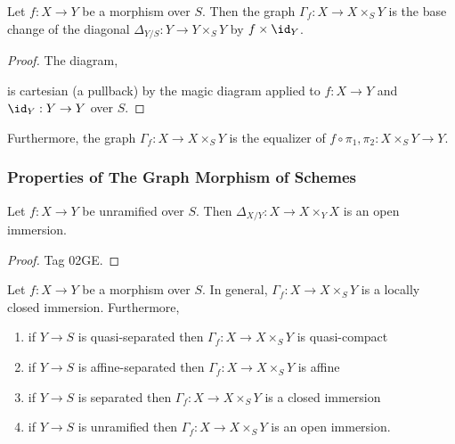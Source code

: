 \documentclass[12pt]{article}
\begin{document}
\begin{cor}
Let $f : X \to Y$ be a morphism over $S$. Then the graph $\Gamma_f : X \to X \times_S Y$ is the base change of the diagonal $\Delta_{Y/S} : Y \to Y \times_S Y$ by $f \times \id_Y$.
\end{cor}

\begin{proof}
The diagram,
\begin{center}
\end{center}
is cartesian (a pullback) by the magic diagram applied to $f : X \to Y$ and $\id_Y : Y \to Y$ over $S$.
\end{proof}

\begin{rmk}
Furthermore, the graph $\Gamma_f : X \to X \times_S Y$ is the equalizer of $f \circ \pi_1, \pi_2 : X \times_S Y \to Y$.
\end{rmk}

\subsubsection{Properties of The Graph Morphism of Schemes}

\begin{lemma}
Let $f : X \to Y$ be unramified over $S$. Then $\Delta_{X/Y} : X \to X \times_Y X$ is an open immersion.
\end{lemma}

\begin{proof}
Tag 02GE.
\end{proof}

\begin{cor}
Let $f : X \to Y$ be a morphism over $S$. In general, $\Gamma_f : X \to X \times_S Y$ is a locally closed immersion. Furthermore,
\begin{enumerate}
\item if $Y \to S$ is quasi-separated then $\Gamma_f : X \to X \times_S Y$ is quasi-compact
\item if $Y \to S$ is affine-separated then $\Gamma_f : X \to X \times_S Y$ is affine
\item if $Y \to S$ is separated then $\Gamma_f : X \to X \times_S Y$ is a closed immersion
\item if $Y \to S$ is unramified then $\Gamma_f : X \to X \times_S Y$ is an open immersion.
\end{enumerate}
\end{cor}
\end{document}
